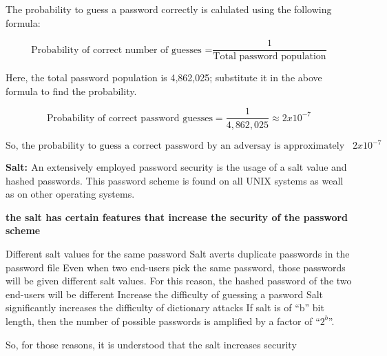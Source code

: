 \documentclass[../CIT288SecurityResearchNotebook.tex]{subfiles}
\begin{document}
The probability to guess a password correctly is calulated using the following formula:
\hspace{0.2cm}
\begin{tcolorbox}[width=6.3in] 
  \begin{equation}
	  \text{Probability of correct number of guesses =} \frac{1}{\text{Total password population}} 
  \end{equation}
\end{tcolorbox}
\hspace{0.2cm}
Here, the total password population is 4,862,025; substitute it in the above formula to find the probability.
\hspace{0.2cm}
\begin{tcolorbox}[width=6.3in] 
	\begin{equation}
\text{Probability of correct password guesses} = \frac{1}{4,862,025} \approx {2}x{10}^{-7}
	\end{equation}
\end{tcolorbox}
\hspace{0.2cm}

\hspace{0.2cm}
\begin{tcolorbox}[width=6.3in] 
	\begin{equation}
		\text{So, the probability to guess a correct password by an adversay is approximately equal to } {2}x{10}^{-7}
	\end{equation}
\end{tcolorbox}
\hspace{0.2cm}


{\bf{Salt: }} An extensively employed password security is the usage of a salt value
and hashed passwords. This password scheme is found on all UNIX systems as weall as on
other operating systems.
\hspace{0.2cm}
\begin{tcolorbox}[width=6.3in]
{\bf{the salt has certain features that increase the security of the password scheme}}
  \begin{outline}
  \1 Different salt values for the same password 
    \2 Salt averts duplicate passwords in the password file
    \2 Even when two end-users pick the same password, those passwords will be given different salt values.
    \2 For this reason, the hashed password of the two end-users will be different
  \1 Increase the difficulty of guessing a pasword
    \2 Salt significantly increases the difficulty of dictionary attacks
    \2 If salt is of ``b'' bit length, then the number of possible passwords is
    amplified by a factor of ``$2^b$''.
  \end{outline}
\end{tcolorbox}
\hspace{0.2cm}
So, for those reasons, it is understood that the salt increases security
\end{document}

